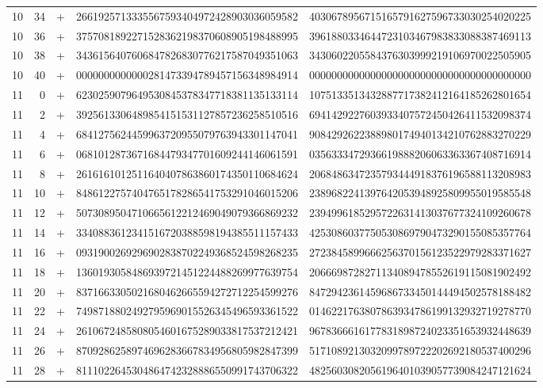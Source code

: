 \begin{longtable}{rrrll}
10 & 34 & + & 2661925713335567593404972428903036059582 & 4030678956715165791627596733030254020225 \\
10 & 36 & + & 3757081892271528362198370608905198488995 & 3961880334644723103467983833088387469113 \\
10 & 38 & + & 3436156407606847826830776217587049351063 & 3430602205584376303999219106970022505905 \\
10 & 40 & + & 0000000000000281473394789457156348984914 & 0000000000000000000000000000000000000000 \\
11 & 0 & + & 6230259079649530845378347718381135133114 & 1075133513432887717382412164185262801654 \\
11 & 2 & + & 3925613306489854151531127857236258510516 & 6941429227603933407572450426411532098374 \\
11 & 4 & + & 6841275624459963720955079763943301147041 & 9084292622388980174940134210762883270229 \\
11 & 6 & + & 0681012873671684479347701609244146061591 & 0356333472936619888206063363367408716914 \\
11 & 8 & + & 2616161012511640407863860174350110684624 & 2068486347235793444918376196588113208983 \\
11 & 10 & + & 8486122757404765178286541753291046015206 & 2389682241397642053948925809955019585548 \\
11 & 12 & + & 5073089504710665612212469049079366869232 & 2394996185295722631413037677324109260678 \\
11 & 14 & + & 3340883612341516720388598194385511157433 & 4253086037750530869790473290155085357764 \\
11 & 16 & + & 0931900269296902838702249368524598268235 & 2723845899666256370156123522979283371627 \\
11 & 18 & + & 1360193058486939721451224488269977639754 & 2066698728271134089478552619115081902492 \\
11 & 20 & + & 8371663305021680462665594272712254599276 & 8472942361459686733450144494502578188482 \\
11 & 22 & + & 7498718802492795969015526345496593361522 & 0146221763807863934786199132932719278770 \\
11 & 24 & + & 2610672485808054601675289033817537212421 & 9678366616177831898724023351653932448639 \\
11 & 26 & + & 8709286258974696283667834956805982847399 & 5171089213032099789722202692180537400296 \\
11 & 28 & + & 8111022645304864742328886550991743706322 & 4825603082056196401039057739084247121624 \\

\end{longtable}
